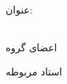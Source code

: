 \begin{center}
\begin{large}
\end{large}

\vspace{1.5cm}

{عنوان:}\\[1.2em]
{\LARGE\textbf{\ThesisTitle}}\\ 
\vspace{1cm}

\vspace{2cm}

{اعضای گروه}\\[.5em]
{\large\textbf{\ThesisAuthor}}

\vspace{1.5cm}

{استاد مربوطه}\\[.5em]
{\large\textbf{\ThesisSupervisor}}

\vspace{1cm}



\vspace{2cm}

\ThesisDate

\end{center}

\newpage
